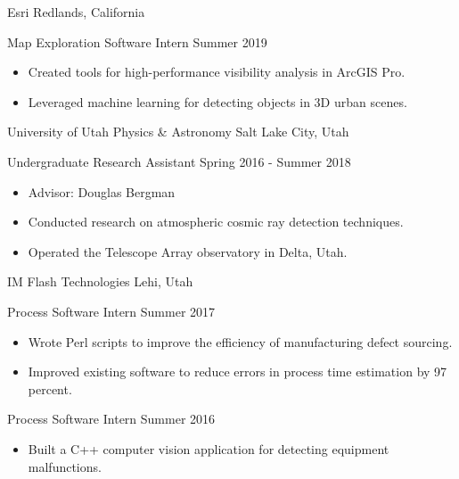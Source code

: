 \begin{tab1} Esri \> Redlands, California \end{tab1}

\begin{tab2} Map Exploration Software Intern \> Summer 2019 \end{tab2}
\begin{itemize}
    \item Created tools for high-performance visibility analysis in ArcGIS Pro.
    \item Leveraged machine learning for detecting objects in 3D urban scenes.
\end{itemize}

\blockskip

\begin{tab1} University of Utah Physics \& Astronomy \> Salt Lake City, Utah \end{tab1}

\begin{tab2} Undergraduate Research Assistant \> Spring 2016 - Summer 2018 \end{tab2}
\begin{itemize}
    \item Advisor: Douglas Bergman
    \item Conducted research on atmospheric cosmic ray detection techniques.
    \item Operated the Telescope Array observatory in Delta, Utah.
\end{itemize}

\blockskip

\begin{tab1} IM Flash Technologies \> Lehi, Utah \end{tab1}

\begin{tab2} Process Software Intern \> Summer 2017 \end{tab2}
\begin{itemize}
    \item Wrote Perl scripts to improve the efficiency of manufacturing defect sourcing.
    \item Improved existing software to reduce errors in process time estimation by 97 percent.
\end{itemize}

\begin{tab2} Process Software Intern \> Summer 2016 \end{tab2}
\begin{itemize}
    \item Built a C++ computer vision application for detecting equipment malfunctions.
\end{itemize}

